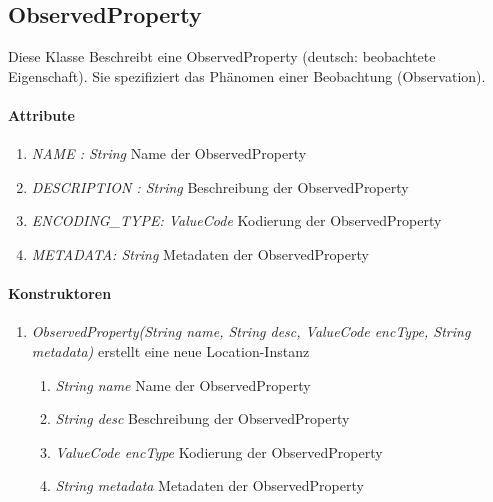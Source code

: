 \subsection{ObservedProperty}
Diese Klasse Beschreibt eine ObservedProperty (deutsch: beobachtete Eigenschaft). Sie spezifiziert das Phänomen einer Beobachtung (Observation).

\paragraph{Attribute}
\begin{enumerate}[$\bullet$]
	\item \textit{NAME : String} Name der ObservedProperty
	\item \textit{DESCRIPTION : String} Beschreibung der ObservedProperty
	\item \textit{ENCODING\_TYPE: ValueCode} Kodierung der ObservedProperty
	\item \textit{METADATA: String} Metadaten der ObservedProperty
\end{enumerate}

\paragraph{Konstruktoren}
\begin{enumerate}[+]
	\item \textit{ ObservedProperty(String name, String desc, ValueCode encType, String metadata)}
	erstellt eine neue Location-Instanz
	\begin{enumerate}[$\bullet$]
		\item \textit{String name} Name der ObservedProperty
		\item \textit{String desc} Beschreibung der ObservedProperty
		\item \textit{ValueCode encType} Kodierung der ObservedProperty
		\item \textit{String metadata} Metadaten der ObservedProperty
	\end{enumerate}
	
\end{enumerate}
